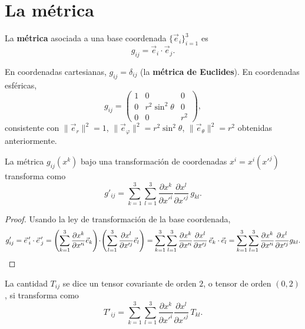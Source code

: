 \section{La métrica}

\begin{definicion}[Métrica]
La \textbf{métrica} asociada a una base coordenada $\{\vec e_i\}_{i=1}^3$
es
\[
g_{ij} = \vec e_i \cdot \vec e_j .
\]
\end{definicion}

\begin{ejemplo}
En coordenadas cartesianas, $g_{ij}=\delta_{ij}$ (la \textbf{métrica de
Euclides}). En coordenadas esféricas,
\[
g_{ij} = \begin{pmatrix} 1 & 0 & 0 \\ 0 & r^2\sin^2\theta & 0 \\ 0 & 0 &
r^2 \end{pmatrix},
\]
consistente con $\|\vec e_r\|^2=1$, $\|\vec e_\varphi\|^2 = r^2\sin^2
\theta$, $\|\vec e_\theta\|^2=r^2$ obtenidas anteriormente.
\end{ejemplo}

\begin{proposicionc}
\label{prop:transf-metrica}
La métrica $g_{ij}(x^k)$ bajo una transformación de coordenadas
$x^i=x^i(x'^j)$ transforma como
\[
g'_{ij} = \sum_{k=1}^{3}\sum_{l=1}^{3} \frac{\partial x^k}{\partial x'^i}
\frac{\partial x^l}{\partial x'^j}\, g_{kl} .
\]
\end{proposicionc}

\begin{proof}
Usando la ley de transformación de la base coordenada,
\[
g'_{ij} = \vec e\,'_i \cdot \vec e\,'_j = \left(\sum_{k=1}^3
\frac{\partial x^k}{\partial x'^i}\vec e_k\right)\!\cdot\!\left(
\sum_{l=1}^3 \frac{\partial x^l}{\partial x'^j}\vec e_l\right)
= \sum_{k=1}^3\sum_{l=1}^3 \frac{\partial x^k}{\partial x'^i}
\frac{\partial x^l}{\partial x'^j}\, \vec e_k\cdot\vec e_l =
\sum_{k=1}^3\sum_{l=1}^3 \frac{\partial x^k}{\partial x'^i}\frac{\partial
x^l}{\partial x'^j} g_{kl} . \qedhere
\]
\end{proof}

\begin{definicion}
La cantidad $T_{ij}$ se dice un tensor covariante de orden $2$, o tensor
de orden $(0,2)$, si transforma como
\[
T'_{ij} = \sum_{k=1}^{3}\sum_{l=1}^{3} \frac{\partial x^k}{\partial
x'^i}\frac{\partial x^l}{\partial x'^j}\, T_{kl} .
\]
\end{definicion}

